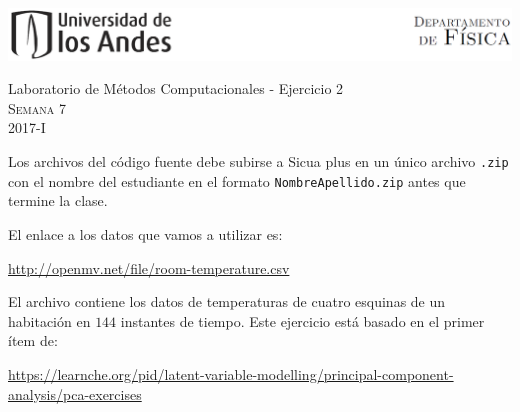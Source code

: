\documentclass[11pt,letterpaper]{exam}
\begin{document}
\begin{center}

\includegraphics[width=16cm]{header.png}

\vspace{1.0cm}
{\Large Laboratorio de M\'etodos Computacionales - Ejercicio 2} \\
\textsc{Semana 7}\\
2017-I\\
\end{center}



\vspace{0.5cm}

\noindent
Los archivos del c\'odigo fuente debe subirse a Sicua plus en un \'unico archivo \verb'.zip' con el nombre del estudiante en el formato \verb"NombreApellido.zip" antes que termine la clase.

El enlace a los datos que vamos a utilizar es:

\url{http://openmv.net/file/room-temperature.csv}

El archivo contiene los datos de temperaturas de cuatro esquinas de un habitaci\'on en $144$ instantes de tiempo. Este ejercicio est\'a basado en el primer \'item de:

\url{https://learnche.org/pid/latent-variable-modelling/principal-component-analysis/pca-exercises}

\vspace{0.5cm}

\begin{questions}
 
\question[1.3]



\question[4.7]


\end{questions}
\end{document}
